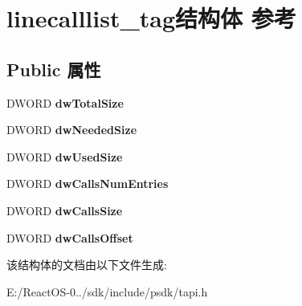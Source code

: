 \hypertarget{structlinecalllist__tag}{}\section{linecalllist\+\_\+tag结构体 参考}
\label{structlinecalllist__tag}
\subsection*{Public 属性}
\begin{DoxyCompactItemize}
\item 
\mbox{\label{structlinecalllist__tag_a4fa2cf9c2fae8e178f294d57b4a1241c}} 
D\+W\+O\+RD {\bfseries dw\+Total\+Size}
\item 
\mbox{\label{structlinecalllist__tag_a2a17810a99d932bdefbeca41737657b4}} 
D\+W\+O\+RD {\bfseries dw\+Needed\+Size}
\item 
\mbox{\label{structlinecalllist__tag_afc63d1d1cdc3bed062eba4226ea2b5d2}} 
D\+W\+O\+RD {\bfseries dw\+Used\+Size}
\item 
\mbox{\label{structlinecalllist__tag_afd49b5a2faeab159ddbd139ecccd565a}} 
D\+W\+O\+RD {\bfseries dw\+Calls\+Num\+Entries}
\item 
\mbox{\label{structlinecalllist__tag_a973767be83f989672912d1d2363afa4b}} 
D\+W\+O\+RD {\bfseries dw\+Calls\+Size}
\item 
\mbox{\label{structlinecalllist__tag_a15c0c2c918487b26ed0bb82c661fc8a7}} 
D\+W\+O\+RD {\bfseries dw\+Calls\+Offset}
\end{DoxyCompactItemize}


该结构体的文档由以下文件生成\+:\begin{DoxyCompactItemize}
\item 
E\+:/\+React\+O\+S-\/0../sdk/include/psdk/tapi.\+h\end{DoxyCompactItemize}
